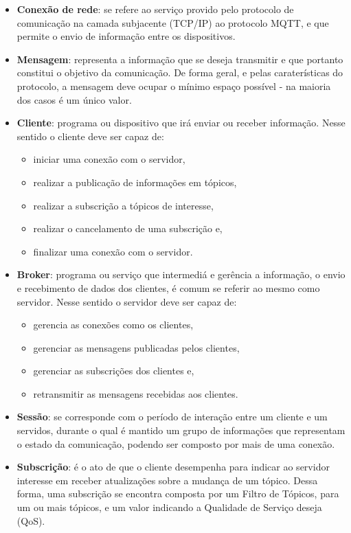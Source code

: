 \documentclass[12pt, a4paper]{article}
\begin{document}
\begin{itemize}
    \item \textbf{Conexão de rede}: se refere ao serviço provido pelo protocolo de comunicação na camada subjacente (TCP/IP) ao protocolo MQTT, e que permite o envio de informação entre os dispositivos.
    \item \textbf{Mensagem}: representa a informação que se deseja transmitir e que portanto constitui o objetivo da comunicação. De forma geral, e pelas caraterísticas do protocolo, a mensagem deve ocupar o mínimo espaço possível - na maioria dos casos é um único valor.
    \item \textbf{Cliente}: programa ou dispositivo que irá enviar ou receber informação. Nesse sentido o cliente deve ser capaz de:
    \begin{itemize}
        \item iniciar uma conexão com o servidor,
        \item realizar a publicação de informações em tópicos,
        \item realizar a subscrição a tópicos de interesse,
        \item realizar o cancelamento de uma subscrição e,
        \item finalizar uma conexão com o servidor.
    \end{itemize}
    \item \textbf{Broker}: programa ou serviço que intermediá e gerência a informação, o envio e recebimento de dados dos clientes, é comum se referir ao mesmo como servidor. Nesse sentido o servidor deve ser capaz de:
    \begin{itemize}
        \item gerencia as conexões como os clientes,
        \item gerenciar as mensagens publicadas pelos clientes,
        \item gerenciar as subscrições dos clientes e,
        \item retransmitir as mensagens recebidas aos clientes.
    \end{itemize}
    \item \textbf{Sessão}: se corresponde com o período de interação entre um cliente e um servidos, durante o qual é mantido um grupo de informações que representam o estado da comunicação, podendo ser composto por mais de uma conexão.
    \item \textbf{Subscrição}: é o ato de que o cliente desempenha para indicar ao servidor interesse em receber atualizações sobre a mudança de um tópico. Dessa forma, uma subscrição se encontra composta por um Filtro de Tópicos, para um ou mais tópicos, e um valor indicando a Qualidade de Serviço deseja (QoS).

\end{itemize}
\end{document}

